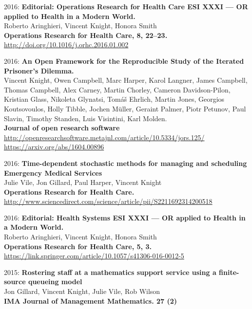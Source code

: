 \documentclass[10pt]{res} %
\begin{document}
\begin{resume}
\begin{etaremune}
\item
2016: \textbf{Editorial: Operations Research for Health Care ESI XXXI — OR applied to Health in a Modern World.}\\
Roberto Aringhieri, Vincent Knight, Honora Smith
\\
\textbf{Operations Research for Health Care, 8, 22–23.}
\\
\url{http://doi.org/10.1016/j.orhc.2016.01.002}
\\

\item
2016: \textbf{An Open Framework for the Reproducible Study of the Iterated Prisoner’s Dilemma.}\\
Vincent Knight, Owen Campbell, Marc Harper, Karol Langner, James Campbell, Thomas Campbell, Alex Carney, Martin Chorley, Cameron Davidson-Pilon, Kristian Glass, Nikoleta Glynatsi, Tomáš Ehrlich, Martin Jones, Georgios Koutsovoulos, Holly Tibble, Jochen Müller, Geraint Palmer, Piotr Petunov, Paul Slavin, Timothy Standen, Luis Visintini, Karl Molden.
\\
\textbf{Journal of open research software}
\\
\url{http://openresearchsoftware.metajnl.com/article/10.5334/jors.125/}
\\
\url{https://arxiv.org/abs/1604.00896}
\\

\item
2016: \textbf{Time-dependent stochastic methods for managing and scheduling Emergency Medical Services}\\
Julie Vile, Jon Gillard, Paul Harper, Vincent Knight
\\
\textbf{Operations Research for Health Care.}
\\
\url{http://www.sciencedirect.com/science/article/pii/S2211692314200518}
\\

\item
2016: \textbf{Editorial: Health Systems ESI XXXI — OR applied to Health in a Modern World.}\\
Roberto Aringhieri, Vincent Knight, Honora Smith
\\
\textbf{Operations Research for Health Care, 5, 3.}
\\
\url{https://link.springer.com/article/10.1057/s41306-016-0012-5}
\\

\item
2015: \textbf{Rostering staff at a mathematics support service using a finite-source queueing model}\\
Jon Gillard, Vincent Knight, Julie Vile, Rob Wilson
\\
\textbf{IMA Journal of Management Mathematics. 27 (2)}
\\


\end{etaremune}
\end{resume}
\end{document}
